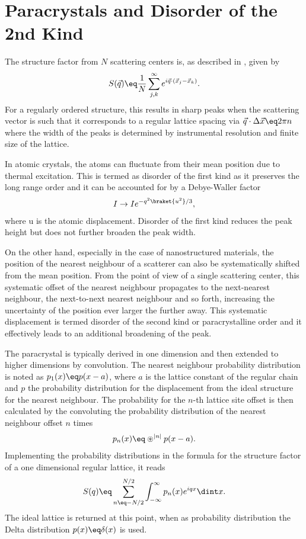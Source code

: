 \documentclass[\main/dresen_thesis.tex]{subfiles}
\begin{document}
\section{Paracrystals and Disorder of the 2nd Kind}\label{ch:appendix:calculations:paracrystal}
The structure factor from $N$ scattering centers is, as described in , given by
\begin{align}
  S(\vec{q}) \eq \frac{1}{N} \sum_{j, k}^{\infty} e^{i\vec{q} \cdot (\vec{x}_j - \vec{x}_k)}.
\end{align}
For a regularly ordered structure, this results in sharp peaks when the scattering vector is such that it corresponds to a regular lattice spacing via $\vec{q} \cdot \Delta \vec{x} \eq 2 \pi n$ where the width of the peaks is determined by instrumental resolution and finite size of the lattice.

In atomic crystals, the atoms can fluctuate from their mean position due to thermal excitation.
This is termed as disorder of the first kind as it preserves the long range order and it can be accounted for by a Debye-Waller factor
\begin{align}
  I \rightarrow I e^{-q^2 \braket{u^2}/3},
\end{align}
where u is the atomic displacement.
Disorder of the first kind reduces the peak height but does not further broaden the peak width.

On the other hand, especially in the case of nanostructured materials, the position of the nearest neighbour of a scatterer can also be systematically shifted from the mean position.
From the point of view of a single scattering center, this systematic offset of the nearest neighbour propagates to the next-nearest neighbour, the next-to-next nearest neighbour and so forth, increasing the uncertainty of the position ever larger the further away.
This systematic displacement is termed disorder of the second kind or paracrystalline order and it effectively leads to an additional broadening of the peak.

The paracrystal is typically derived in one dimension and then extended to higher dimensions by convolution.
The nearest neighbour probability distribution is noted as $p_1(x) \eq p(x-a)$, where $a$ is the lattice constant of the regular chain and $p$ the probability distribution for the displacement from the ideal structure for the nearest neighbour.
The probability for the $n$-th lattice site offset is then calculated by the convoluting the probability distribution of the nearest neighbour offset $n$ times
\begin{align}
  p_n (x) \eq \circledast^{|n|} p(x-a).
\end{align}
Implementing the probability distributions in the formula for the structure factor of a one dimensional regular lattice, it reads
\begin{align}
  S(q) \eq \sum_{n\eq -N/2}^{N/2} \int_{- \infty}^\infty p_n(x) e^{i q x} \dint x.
\end{align}
The ideal lattice is returned at this point, when as probability distribution the Delta distribution $p(x) \eq \delta(x)$ is used.
\end{document}
